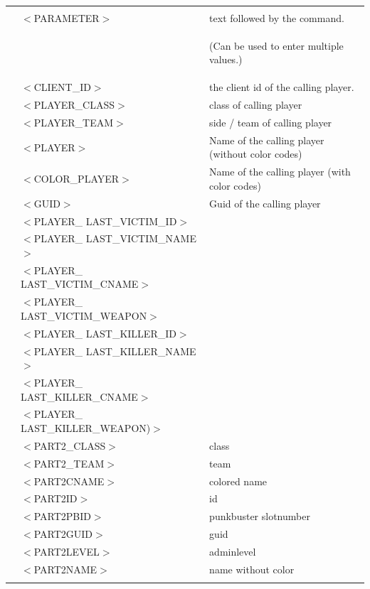 \documentclass[12pt,a4paper]{article}
\begin{document}
\begin{table}[h]\footnotesize
\begin{tabular}{l l|l}
\hline & & \\
 & $<$PARAMETER$>$					& text followed by the command.  \\
 && \begin{small}
(Can be used to enter multiple values.)
\end{small} \\
 & $<$CLIENT\_ID$>$					& the client id of the calling player.\\
 & $<$PLAYER\_CLASS$>$ 				& class of calling player\\
 & $<$PLAYER\_TEAM$>$ 				& side / team of calling player \\
 & $<$PLAYER$>$						& Name of the calling player (without color codes)\\
 & $<$COLOR\_PLAYER$>$				& Name of the calling player (with color codes)\\
 & $<$GUID$>$						& Guid of the calling player\\
 
 & $<$PLAYER\_ LAST\_VICTIM\_ID$>$ 		& 		\\
 & $<$PLAYER\_ LAST\_VICTIM\_NAME$>$ 	&		\\
 & $<$PLAYER\_ LAST\_VICTIM\_CNAME$>$ 	&		\\
 & $<$PLAYER\_ LAST\_VICTIM\_WEAPON$>$ 	&		\\

 & $<$PLAYER\_ LAST\_KILLER\_ID$>$ 		&		\\ 
 & $<$PLAYER\_ LAST\_KILLER\_NAME$>$ 	& 		\\ 
 & $<$PLAYER\_ LAST\_KILLER\_CNAME$>$ 	& 		\\ 
 & $<$PLAYER\_ LAST\_KILLER\_WEAPON)$>$ & 		\\ 
 
 & $<$PART2\_CLASS$>$					& class				\\
 & $<$PART2\_TEAM$>$ 					& team				\\
 & $<$PART2CNAME$>$						& colored name		\\
 & $<$PART2ID$>$						& id				\\
 & $<$PART2PBID$>$						& punkbuster slotnumber\\
 & $<$PART2GUID$>$						& guid				\\
 & $<$PART2LEVEL$>$						& adminlevel		\\
 & $<$PART2NAME$>$						& name without color\\

 & &  \\
 \hline
\end{tabular}
\end{table}
\end{document}
